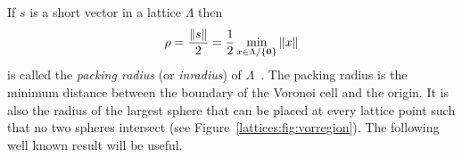 \documentclass[final,leqno]{siamltex}
\begin{document}

If $s$ is a short vector in a lattice $\Lambda$ then 
\[
\rho = \frac{\|s\|}{2} = \frac{1}{2} \min_{x \in \Lambda / \{\boldsymbol{0}\} } \|x\|
\]
is called the \emph{packing radius} (or \emph{inradius}) of $\Lambda$~\cite{SPLAG}.  The packing radius is the minimum distance between the boundary of the Voronoi cell and the origin.  It is also the radius of the largest sphere that can be placed at every lattice point such that no two spheres intersect (see Figure~\ref{lattices:fig:vorregion}).  The following well known result will be useful.

\end{document}
